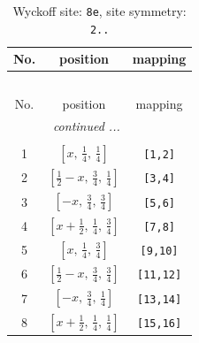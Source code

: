 \documentclass[fleqn,8pt]{jsarticle}
\begin{document}
\begin{longtable}{ccc}
\caption{Wyckoff site: {\tt 8e}, site symmetry: {\tt 2..}}
 \\
 \hline \hline
No. & position & mapping \\ \hline \endfirsthead

\multicolumn{2}{l}{\tablename\ \thetable{}} \\
 \hline \hline
No. & position & mapping \\ \hline \endhead

 \hline \hline
\multicolumn{2}{r}{\footnotesize\it continued ...} \\ \endfoot

 \hline \hline
\multicolumn{2}{r}{} \\ \endlastfoot

1 & $\left[ x,\, \frac{1}{4},\, \frac{1}{4} \right]$ & {\tt [1,2]} \\ \hline
2 & $\left[ \frac{1}{2} - x,\, \frac{3}{4},\, \frac{1}{4} \right]$ & {\tt [3,4]} \\ \hline
3 & $\left[ - x,\, \frac{3}{4},\, \frac{3}{4} \right]$ & {\tt [5,6]} \\ \hline
4 & $\left[ x + \frac{1}{2},\, \frac{1}{4},\, \frac{3}{4} \right]$ & {\tt [7,8]} \\ \hline
5 & $\left[ x,\, \frac{1}{4},\, \frac{3}{4} \right]$ & {\tt [9,10]} \\ \hline
6 & $\left[ \frac{1}{2} - x,\, \frac{3}{4},\, \frac{3}{4} \right]$ & {\tt [11,12]} \\ \hline
7 & $\left[ - x,\, \frac{3}{4},\, \frac{1}{4} \right]$ & {\tt [13,14]} \\ \hline
8 & $\left[ x + \frac{1}{2},\, \frac{1}{4},\, \frac{1}{4} \right]$ & {\tt [15,16]} \\
\end{longtable}
\renewcommand{\arraystretch}{1.2}
\end{document}
